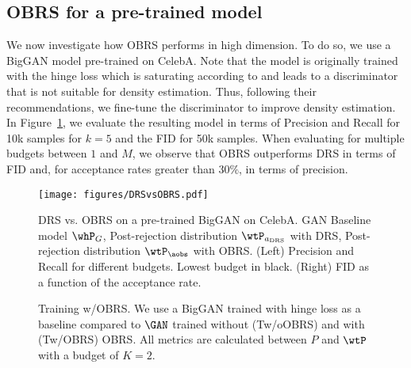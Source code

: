 \documentclass[twoside]{article}
\begin{document}
\subsection{OBRS for a pre-trained model}
We now investigate how OBRS performs in high dimension. To do so, we use a BigGAN model  \citep{brock_large_2019} pre-trained on CelebA. Note that the model is originally  trained with the hinge loss which is saturating according to \cite{azadi_discriminator_2019} and leads to a discriminator that is not suitable for density estimation. Thus, following their recommendations, we fine-tune the discriminator to improve density estimation. In Figure~\ref{fig:DRSvsOBRS}, we evaluate the resulting model in terms of  Precision and Recall \citep{kynkaanniemi_improved_2019} for 10k samples for $k=5$ and the FID for 50k samples. When evaluating for multiple budgets between $1$ and $M$, we observe that OBRS outperforms DRS in terms of FID and, for acceptance rates greater than $30\%$, in terms of precision. 
\begin{figure}[t!]
    \centering
    \texttt{[image: figures/DRSvsOBRS.pdf]}
    \caption{DRS vs. OBRS on a pre-trained BigGAN on CelebA.  GAN Baseline model $\whP_G$, Post-rejection distribution $\wtP_{a_{\mathrm{DRS}}}$ with DRS, Post-rejection distribution $\wtP_{\aobs}$ with OBRS. (Left) Precision and Recall for different budgets. Lowest budget in black. (Right) FID as a function of the acceptance rate.}
    \label{fig:DRSvsOBRS}
\end{figure}
\begin{figure}[t!]
    \vspace{10pt}
    \caption{Training w/OBRS. We use a BigGAN \citep{brock_large_2019}  trained with hinge loss as a baseline compared to $\GAN$ trained without (Tw/oOBRS) and with (Tw/OBRS) OBRS. All metrics are calculated between $P$ and $\wtP$ with a budget of $K=2$.}
    \label{fig:trainingobrs}
\end{figure}
\end{document}

